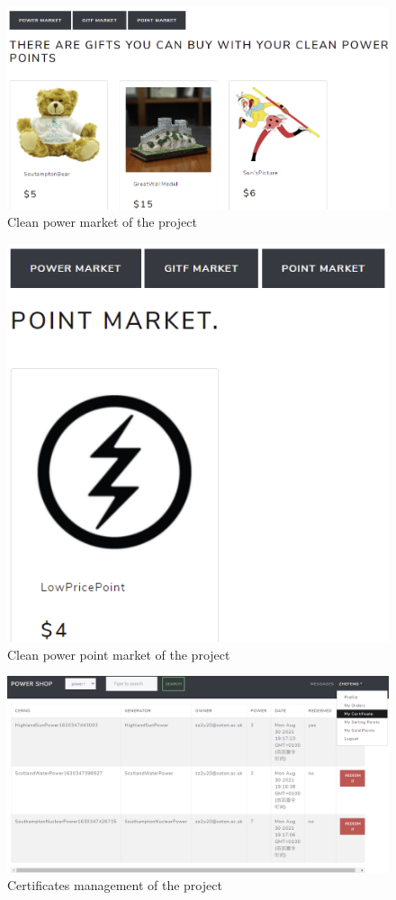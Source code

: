 \begin{figure}[!htb]
    \centering
    \includegraphics[width=.7 \textwidth]{img/giftmarket.png}
    \caption{Clean power market of the project}
    \label{fig:giftmarket}
\end{figure}
\begin{figure}[!htb]
    \centering
    \includegraphics[width= .7 \textwidth]{img/pointmarket.png}
    \caption{Clean power point market of the project}
    \label{fig:pointmarket}
\end{figure}
\begin{figure}[!htb]
    \centering
    \includegraphics[width=\textwidth]{img/certificateManage.png}
    \caption{Certificates management of the project}
    \label{fig:certmanage}
\end{figure}

